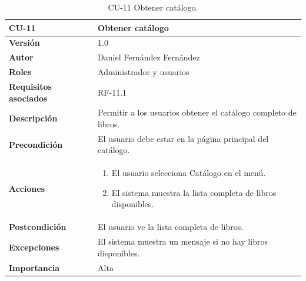 \begin{table}[p]
        \centering
        \begin{tabularx}{\linewidth}{ p{} p{} }
            \toprule
            \textbf{CU-11} & \textbf{Obtener catálogo}\\
            \toprule
            \textbf{Versión} & 1.0 \\
            \textbf{Autor} & Daniel Fernández Fernández \\
            \textbf{Roles} & Administrador y usuarios \\
            \textbf{Requisitos asociados} & RF-11.1 \\
            \textbf{Descripción} & Permitir a los usuarios obtener el catálogo completo de libros. \\
            \textbf{Precondición} & El usuario debe estar en la página principal del catálogo. \\
            \textbf{Acciones} &
            \begin{enumerate}
            \def\labelenumi{\arabic{enumi}.}
            \tightlist
            \item El usuario selecciona Catálogo en el menú.
            \item El sistema muestra la lista completa de libros disponibles.
            \end{enumerate}\\
            \textbf{Postcondición} & El usuario ve la lista completa de libros. \\
            \textbf{Excepciones} & El sistema muestra un mensaje si no hay libros disponibles. \\
            \textbf{Importancia} & Alta \\
            \bottomrule
        \end{tabularx}
        \caption{CU-11 Obtener catálogo.}
\end{table}


